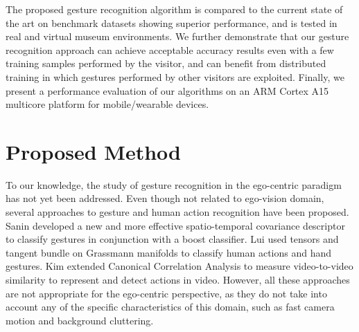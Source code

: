 The proposed gesture recognition algorithm is compared to the current state of the art on benchmark datasets showing superior performance, and is tested in real and virtual museum environments. We further demonstrate that our gesture recognition approach can achieve acceptable accuracy results even with a few training samples performed by the visitor, and can benefit from distributed training in which gestures performed by other visitors are exploited. Finally, we present a performance evaluation of our algorithms on an ARM Cortex A15 multicore platform for mobile/wearable devices.


\section{Proposed Method}
To our knowledge, the study of gesture recognition in the ego-centric paradigm has not yet been addressed. Even though not related to ego-vision domain, several approaches to gesture and human action recognition have been proposed. Sanin \etal \cite{sanin2013spatio} developed a new and more effective spatio-temporal covariance descriptor to classify gestures in conjunction with a boost classifier. Lui \etal \cite{lui2010action, lui2011tangent} used tensors and tangent bundle on Grassmann manifolds to classify human actions and hand gestures. Kim \etal \cite{kim2009canonical} extended Canonical Correlation Analysis to measure video-to-video similarity to represent and detect actions in video. However, all these approaches are not appropriate for the ego-centric perspective, as they do not take into account any of the specific characteristics of this domain, such as fast camera motion and background cluttering.
